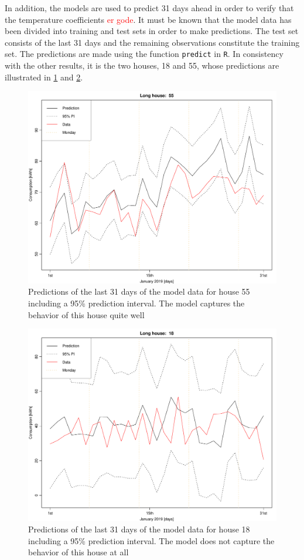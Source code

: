 \noindent In addition, the models are used to predict 31 days ahead in order to verify that the temperature coefficients \textcolor{red}{er gode}. It must be known that the model data has been divided into training and test sets in order to make predictions. The test set consists of the last 31 days and the remaining observations constitute the training set. The predictions are made using the function \texttt{predict} in \texttt{R}. In consistency with the other results, it is the two houses, 18 and 55, whose predictions are illustrated in \cref{fig: lmpred_55L} and \cref{fig: lmpred_18L}. 
\begin{figure}
    \centering
    \includegraphics[width=.8\textwidth]{../../../figures/lmpred_55L.pdf}
    \caption{Predictions of the last 31 days of the model data for house 55 including a 95\% prediction interval. The model captures the behavior of this house quite well}
    \label{fig: lmpred_55L}
\end{figure} 
\begin{figure}
    \centering
    \includegraphics[width=.8\textwidth]{../../../figures/lmpred_18L.pdf}
    \caption{Predictions of the last 31 days of the model data for house 18 including a 95\% prediction interval. The model does not capture the behavior of this house at all}
    \label{fig: lmpred_18L}
\end{figure}
